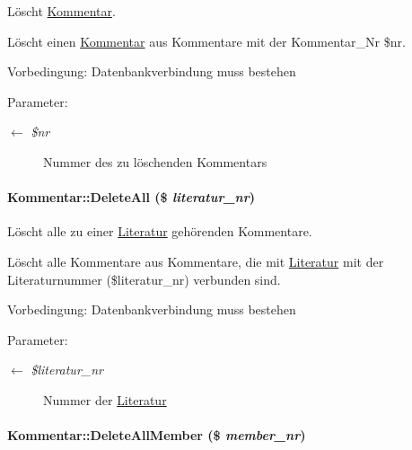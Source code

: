 Löscht \hyperlink{classKommentar}{Kommentar}. 

Löscht einen \hyperlink{classKommentar}{Kommentar} aus Kommentare mit der Kommentar\_\-Nr \$nr. \begin{Desc}
\item[Vorbedingung:]Datenbankverbindung muss bestehen \end{Desc}
\begin{Desc}
\item[Parameter:]
\begin{description}
\item[\mbox{$\leftarrow$} {\em \$nr}]Nummer des zu löschenden Kommentars \end{description}
\end{Desc}
\hypertarget{classKommentar_9903f1df98f71eefa3b44a81d6a8ee5c}{
\paragraph[DeleteAll]{\setlength{\rightskip}{0pt plus 5cm}Kommentar::Delete\-All (\$ {\em literatur\_\-nr})}\hfill}
\label{classKommentar_9903f1df98f71eefa3b44a81d6a8ee5c}


Löscht alle zu einer \hyperlink{classLiteratur}{Literatur} gehörenden Kommentare. 

Löscht alle Kommentare aus Kommentare, die mit \hyperlink{classLiteratur}{Literatur} mit der Literaturnummer (\$literatur\_\-nr) verbunden sind. \begin{Desc}
\item[Vorbedingung:]Datenbankverbindung muss bestehen \end{Desc}
\begin{Desc}
\item[Parameter:]
\begin{description}
\item[\mbox{$\leftarrow$} {\em \$literatur\_\-nr}]Nummer der \hyperlink{classLiteratur}{Literatur} \end{description}
\end{Desc}
\hypertarget{classKommentar_92a8fcea1b065341c7c53e8a8464fcf0}{
\paragraph[DeleteAllMember]{\setlength{\rightskip}{0pt plus 5cm}Kommentar::Delete\-All\-Member (\$ {\em member\_\-nr})}\hfill}
\label{classKommentar_92a8fcea1b065341c7c53e8a8464fcf0}



